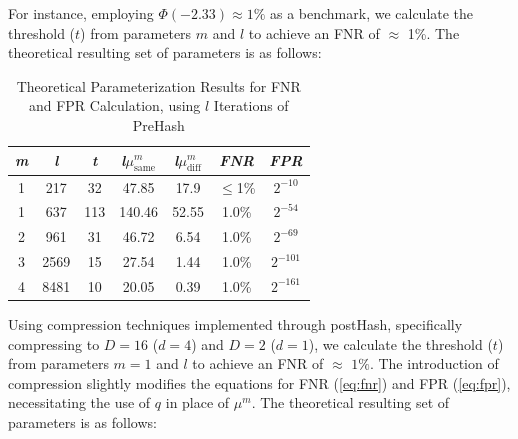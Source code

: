 For instance, employing \(\Phi(-2.33) \approx 1\%\) as a benchmark, we calculate the threshold (\(t\)) from parameters \(m\) and \(l\) to achieve an FNR of \(\approx\) 1\%. The theoretical resulting set of parameters is as follows: 

\begin{table}[htbp] 
    \centering
    \begin{tabular}{|c|c|c|c|c|c|c|}
        \hline
        \textit{m} & \textit{l} & \textit{t} & \textit{l}\(\mu_{\text{same}}^m\) & \textit{l}\(\mu_{\text{diff}}^m\) & \textit{FNR} & \textit{FPR} \\
        \hline
        1 & 217 & 32 & 47.85 & 17.9 & \(\leq\)1\% & \(2^{-10}\)\\
        1 & 637 & 113 & 140.46 & 52.55 & 1.0\% & \(2^{-54}\) \\
        2 & 961 & 31 & 46.72 & 6.54 & 1.0\% & \(2^{-69}\) \\
        3 & 2569 & 15 & 27.54 & 1.44 & 1.0\% &\(2^{-101}\) \\
        4 & 8481 & 10 & 20.05 & 0.39 & 1.0\% & \(2^{-161}\) \\
        \hline
    \end{tabular}
    \caption{Theoretical Parameterization Results for FNR and FPR Calculation, using $l$ Iterations of PreHash}
    \label{tab:theoretical_parameterization_PreHash}
\end{table}

Using compression techniques implemented through postHash, specifically compressing to \( D = 16 \) (\( d = 4 \)) and \( D = 2 \) (\( d = 1 \)), we calculate the threshold (\( t \)) from parameters \( m = 1 \) and \( l \) to achieve an FNR of \(\approx\) \(1\%\). The introduction of compression slightly modifies the equations for FNR (\ref{eq:fnr}) and FPR (\ref{eq:fpr}), necessitating the use of \( q \) in place of \(\mu^m\). The theoretical resulting set of parameters is as follows:

